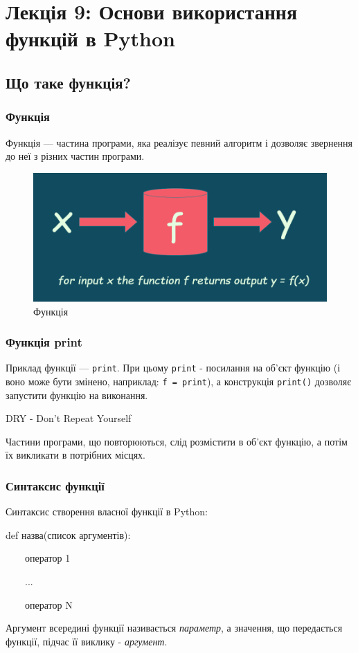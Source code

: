 \section*{Лекція 9: Основи використання функцій в Python}
 
 \subsection{Що таке функція?} 
\begin{frame}
\frametitle{Функція}
Функція — частина програми, яка реалізує певний алгоритм і дозволяє звернення до неї з різних частин програми.
\begin{figure}
  \begin{center}
    \includegraphics[width=\textwidth,height=0.4\textheight]{pictures/function.png}
  \caption{Функція}
\label{function}
  \end{center}
\end{figure}
\end{frame}

\begin{frame}
\frametitle{Функція print}
Приклад функції — \texttt{print}. При цьому \texttt{print} - посилання на об'єкт функцію (і воно може бути змінено, наприклад: \texttt{f = print}), а конструкція \texttt{print()} дозволяє запустити функцію на виконання.

\begin{center}
\large{DRY - Don't Repeat Yourself}
\end{center}

\normalsize Частини програми, що повторюються, слід розмістити в об'єкт функцію, а потім їх викликати в потрібних місцях.
\end{frame}

\begin{frame}
\frametitle{Синтаксис функції}
Синтаксис створення власної функції в Python:

\Large{def назва(список аргументів):

~~~~оператор 1

~~~~... 

~~~~оператор N }

\vspace{0.5cm}
\normalsize Аргумент всередині функції називається \textit{параметр}, а значення, що передається функції, підчас її виклику - \textit{аргумент}.
\end{frame}

